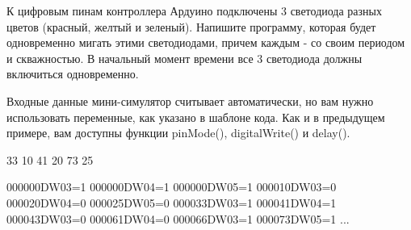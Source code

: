 
К цифровым пинам контроллера Ардуино подключены 3 светодиода разных цветов (красный, желтый и зеленый).   Напишите
программу, которая будет одновременно мигать этими светодиодами, причем каждым - со своим периодом и скважностью.  
В начальный момент времени все 3 светодиода должны включиться одновременно. 

Входные данные мини-симулятор считывает автоматически, но вам нужно использовать переменные, как указано в шаблоне кода.  Как и в предыдущем примере, вам доступны функции pinMode(), digitalWrite() и delay().

\begin{myverbbox}[\small]{\vinput}
    33 10 41 20 73 25
\end{myverbbox}
\begin{myverbbox}[\small]{\voutput}
    000000DW03=1
    000000DW04=1
    000000DW05=1
    000010DW03=0
    000020DW04=0
    000025DW05=0
    000033DW03=1
    000041DW04=1
    000043DW03=0
    000061DW04=0
    000066DW03=1
    000073DW05=1
    ...
\end{myverbbox}

